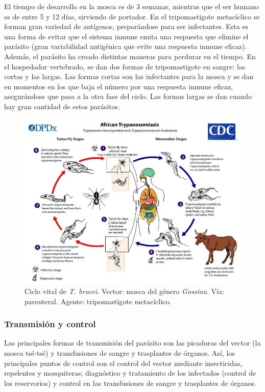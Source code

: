 El tiempo de desarrollo en la mosca es de 3 semanas, mientras que el ser humano es de entre 5 y 12 días, sirviendo de portador. En el tripomastigote metacíclico se forman gran variedad de antígenos, preparándose para ser infectantes. Esta es una forma de evitar que el sistema inmune emita una respuesta que elimine el parásito (gran variabilidad antigénica que evite una respuesta inmune eficaz). Además, el parásito ha creado distintas maneras para perdurar en el tiempo. En el hospedador vertebrado, se dan dos formas de tripomastigote en sangre: las cortas y las largas. Las formas cortas son las infectantes para la mosca y se dan en  momentos en los que baja el número por una respuesta inmune eficaz, asegurándose que pasa a la otra fase del ciclo. Las formas largas se dan cuando hay gran cantidad de estos parásitos.
\begin{figure}[H]
	\centering
	\includegraphics[width=0.8\columnwidth]{A.imagenes/ACV-BioSan-Parasit-TbruceiCBios}
	\caption[Ciclo vital de \textit{T. brucei}]{Ciclo vital de \textit{T. brucei}. Vector: mosca del género \textit{Gossina}. Vía: parenteral. Agente: tripomastigote metacíclico.\label{fig:PARASIT:TBruceiCBios}}
\end{figure}
\subsubsection{Transmisión y control}
Las principales formas de transmisión del parásito son las picaduras del vector (la mosca tsé-tsé) y transfusiones de sangre y trasplantes de órganos. Así, los principales puntos de control son el control del vector mediante insecticidas, repelentes y mosquiteras; diagnóstico y tratamiento de los infectados (control de los reservorios) y control en las transfusiones de sangre y trasplantes de órganos.
